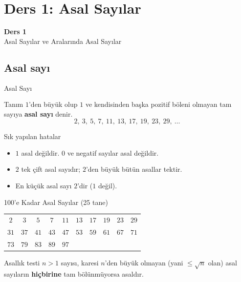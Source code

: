 \documentclass[aspectratio=169,11pt,handout]{beamer}
\begin{document}
\section{Ders 1: Asal Sayılar}
\begin{frame}
\centering\Large\color{anamavi}\textbf{Ders 1}\\[6pt]\normalsize Asal Sayılar ve Aralarında Asal Sayılar
\end{frame}

\subsection{Asal sayı}
\begin{frame}{Asal Sayı}
\begin{block}{Tanım}
\(1\)'den büyük olup \(1\) ve kendisinden başka pozitif böleni olmayan tam sayıya \textbf{asal sayı} denir.
\[2,\ 3,\ 5,\ 7,\ 11,\ 13,\ 17,\ 19,\ 23,\ 29,\ \dots\]
\end{block}
\begin{alertblock}{Sık yapılan hatalar}
\begin{itemize}
\item \(1\) asal değildir. \(0\) ve negatif sayılar asal değildir.
\item \(2\) tek çift asal sayıdır; \(2\)'den büyük bütün asallar tektir.
\item En küçük asal sayı \(2\)'dir (\(1\) değil).
\end{itemize}
\end{alertblock}
\end{frame}

\begin{frame}{100'e Kadar Asal Sayılar (25 tane)}
\begin{center}
\large
\renewcommand{\arraystretch}{1.3}
\begin{tabular}{cccccccccc}
\toprule
\(2\) & \(3\) & \(5\) & \(7\) & \(11\) & \(13\) & \(17\) & \(19\) & \(23\) & \(29\)\\
\(31\) & \(37\) & \(41\) & \(43\) & \(47\) & \(53\) & \(59\) & \(61\) & \(67\) & \(71\)\\
\(73\) & \(79\) & \(83\) & \(89\) & \(97\) & & & & & \\\bottomrule
\end{tabular}
\end{center}
\begin{block}{Asallık testi}
\(n>1\) sayısı, karesi \(n\)'den büyük olmayan (yani \(\le\sqrt{n}\) olan) asal sayıların \textbf{hiçbirine} tam bölünmüyorsa asaldır.
\end{block}
\end{frame}
\end{document}

